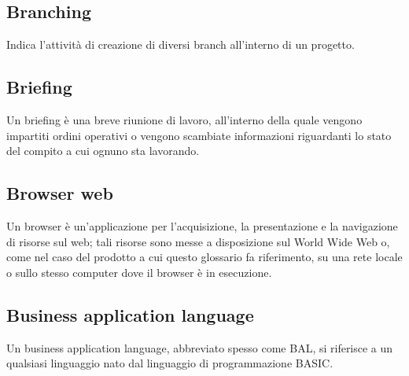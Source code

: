 \subsection*{Branching}
Indica l'attività di creazione di diversi branch all'interno di un progetto.

\subsection*{Briefing}
Un briefing è una breve riunione di lavoro, all'interno della quale vengono impartiti ordini operativi o vengono scambiate informazioni riguardanti lo stato del compito a cui ognuno sta lavorando.

\subsection*{Browser web}
Un browser è un'applicazione per l'acquisizione, la presentazione e la navigazione di risorse sul web; tali risorse sono messe a disposizione sul World Wide Web o, come nel caso del prodotto a cui questo glossario fa riferimento, su una rete locale o sullo stesso computer dove il browser è in esecuzione.

\subsection*{Business application language}
Un business application language, abbreviato spesso come BAL, si riferisce a un qualsiasi linguaggio nato dal linguaggio di programmazione BASIC.


